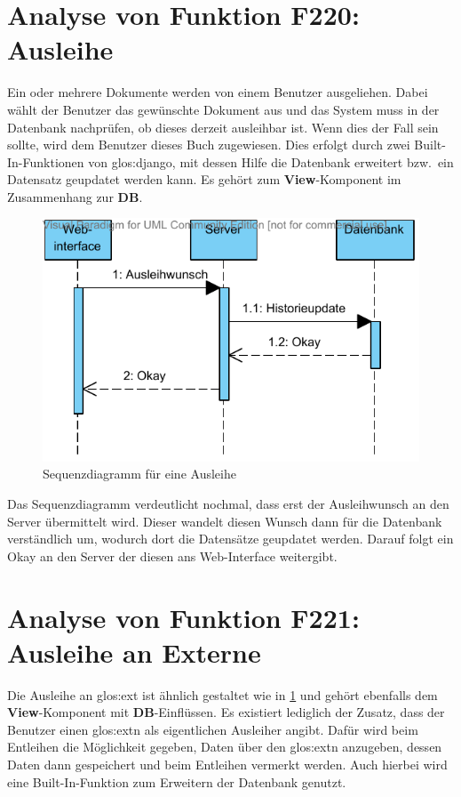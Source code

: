 \section{Analyse von Funktion F220: Ausleihe}
\label{f:220}
Ein oder mehrere Dokumente werden von einem Benutzer ausgeliehen. Dabei wählt 
der Benutzer das gewünschte Dokument aus und das System muss in der Datenbank 
nachprüfen, ob dieses derzeit ausleihbar ist. Wenn dies der Fall sein sollte, 
wird dem Benutzer dieses Buch zugewiesen. Dies erfolgt durch zwei 
Built-In-Funktionen von \gls{glos:django}, mit dessen Hilfe die Datenbank 
erweitert bzw.\ ein Datensatz geupdatet werden kann. Es gehört zum 
\textbf{View}-Komponent im Zusammenhang zur \textbf{DB}.

\begin{figure}[H]
\begin{center}
\includegraphics[width=0.8\linewidth]{bilder/seq-uebertragen.pdf}
\caption{Sequenzdiagramm für eine Ausleihe}
\label{fig:220}
\end{center}
\end{figure}

Das Sequenzdiagramm verdeutlicht nochmal, dass erst der Ausleihwunsch an den Server übermittelt wird. Dieser wandelt diesen Wunsch dann für die Datenbank verständlich um, wodurch dort die Datensätze geupdatet werden. Darauf folgt ein Okay an den Server der diesen ans Web-Interface weitergibt.

\section{Analyse von Funktion F221: Ausleihe an Externe}
\label{f:221}
Die Ausleihe an \gls{glos:ext} ist ähnlich gestaltet wie in \ref{f:220} 
 und gehört ebenfalls dem \textbf{View}-Komponent mit 
\textbf{DB}-Einflüssen. Es existiert lediglich der Zusatz, dass der Benutzer 
einen \gls{glos:ext}n als eigentlichen Ausleiher angibt. Dafür wird beim 
Entleihen die Möglichkeit gegeben, Daten über den \gls{glos:ext}n anzugeben, 
dessen Daten dann gespeichert und beim Entleihen vermerkt werden. Auch hierbei 
wird eine Built-In-Funktion zum Erweitern der Datenbank genutzt.

